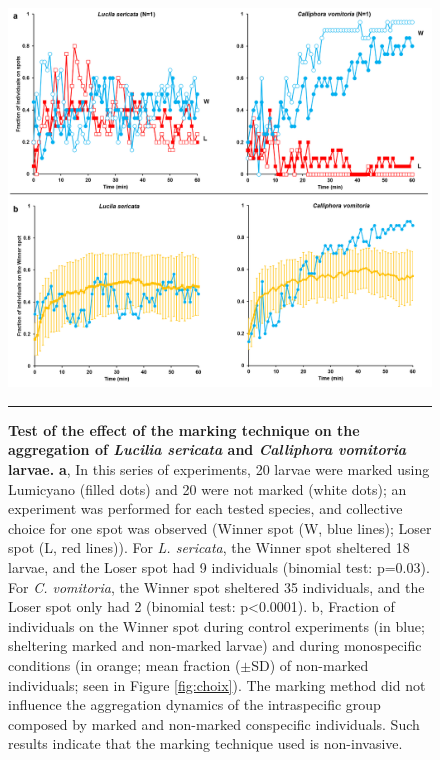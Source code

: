 \begin{figure}[h]
\centering
		\includegraphics[width=1 \textwidth]{Figures/testagreg.png}
		\rule{35em}{0.5pt}
		\caption[Testagreg]{\textbf{Test of the effect of the marking technique on the aggregation of \textit{Lucilia sericata} and \textit{Calliphora vomitoria} larvae.} \textbf{a}, In this series of experiments, 20 larvae were marked using Lumicyano (filled dots) and 20 were not marked (white dots); an experiment was performed for each tested species, and collective choice for one spot was observed (Winner spot (W, blue lines); Loser spot (L, red lines)). For \textit{L. sericata}, the Winner spot sheltered 18 larvae, and the Loser spot had 9 individuals (binomial test: p=0.03). For \textit{C. vomitoria}, the Winner spot sheltered 35 individuals, and the Loser spot only had 2 (binomial test: p<0.0001). b, Fraction of individuals on the Winner spot during control experiments (in blue; sheltering marked and non-marked larvae) and during monospecific conditions (in orange; mean fraction ($\pm$SD) of non-marked individuals; seen in Figure \ref{fig:choix}). The marking method did not influence the aggregation dynamics of the intraspecific group composed by marked and non-marked conspecific individuals. Such results indicate that the marking technique used is non-invasive.}
	\label{fig:testagreg}
\end{figure}    

\clearpage

